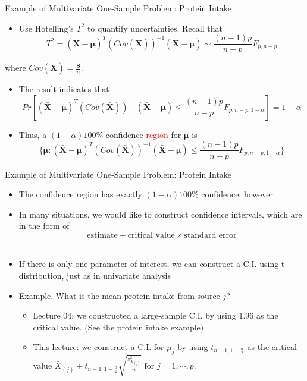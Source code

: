 \documentclass[
  ignorenonframetext,
]{beamer}
\providecommand{\tightlist}{%
  \setlength{\itemsep}{0pt}\setlength{\parskip}{0pt}}
\begin{document}
\begin{frame}{Example of Multivariate One-Sample Problem: Protein
Intake}
\protect\hypertarget{example-of-multivariate-one-sample-problem-protein-intake-2}{}
\begin{itemize}
\tightlist
\item
  Use Hotelling's \(T^2\) to quantify uncertainties. Recall that
  \[T^2=(\bar{\mathbf X} - \boldsymbol \mu)^T \left(Cov(\bar{\mathbf X})\right)^{-1}(\bar{\mathbf X} - \boldsymbol \mu)\sim \frac{(n-1)p}{n-p} F_{p, n-p}\]
\end{itemize}

where \(Cov(\bar{\mathbf X})=\frac{\mathbf S}{n}\).

\begin{itemize}
\item
  The result indicates that
  \[Pr[(\bar{\mathbf X} - \boldsymbol \mu)^T \left(Cov(\bar{\mathbf X})\right)^{-1}(\bar{\mathbf X} - \boldsymbol \mu)\le \frac{(n-1)p}{n-p} F_{p, n-p, 1-\alpha}]=1-\alpha\]
\item
  Thus, a \((1-\alpha)100\%\) confidence \textcolor{red}{region} for
  \(\boldsymbol \mu\) is
  \[\{\mathbf\mu: (\bar{\mathbf X} - \boldsymbol \mu)^T \left(Cov(\bar{\mathbf X})\right)^{-1}(\bar{\mathbf X} - \boldsymbol \mu)\le \frac{(n-1)p}{n-p} F_{p, n-p, 1-\alpha}\}\]
\end{itemize}
\end{frame}

\begin{frame}{Example of Multivariate One-Sample Problem: Protein
Intake}
\protect\hypertarget{example-of-multivariate-one-sample-problem-protein-intake-3}{}
\begin{itemize}
\tightlist
\item
  The confidence region has exactly \((1-\alpha)100\%\) confidence;
  however
\item
  In many situations, we would like to construct confidence intervals,
  which are in the form of
  \[\mbox{estimate}\pm \mbox{critical value} \times \mbox{standard error}\]\\
\item
  If there is only one parameter of interest, we can construct a C.I.
  using t-distribution, just as in univariate analysis
\item
  Example. What is the mean protein intake from source \(j\)?

  \begin{itemize}
  \tightlist
  \item
    Lecture 04: we constructed a large-sample C.I. by using 1.96 as the
    critical value. (See the protein intake example)
  \item
    This lecture: we construct a C.I. for \(\mu_j\) by using
    \(t_{n-1, 1-\frac{\alpha}{2}}\) as the critical value
    \(\bar{X}_{(j)} \pm t_{n-1, 1- \frac{\alpha}{2}}\sqrt{\frac{s^2_{X_{(j)}}}{n}} \mbox{ for } j=1,\cdots, p\).
  \end{itemize}
\end{itemize}
\end{frame}
\end{document}
